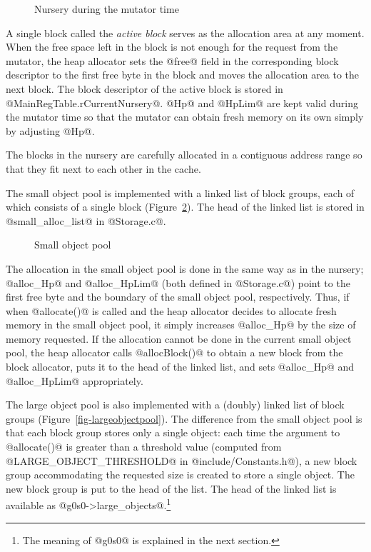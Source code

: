 \documentclass{article}
\begin{document}
\begin{figure}[ht]
\begin{center}

\caption{Nursery during the mutator time}
\label{fig-nursery}
\end{center}
\end{figure}

A single block called the \emph{active block} serves as the allocation area 
at any moment.
When the free space left in the block is not enough for the request from 
the mutator, the heap allocator sets the @free@ field in the corresponding
block descriptor to the first free byte in the block and moves the allocation
area to the next block. 
The block descriptor of the active block is stored in 
@MainRegTable.rCurrentNursery@.
@Hp@ and @HpLim@ are kept valid during the mutator time so that
the mutator can obtain fresh memory on its own simply by adjusting @Hp@. 

The blocks in the nursery are carefully allocated in a contiguous address
range so that they fit next to each other in the cache. 

The small object pool is implemented with a linked list of block groups, 
each of which consists of a single block (Figure~\ref{fig-smallobjectpool}).
The head of the linked list is stored in @small_alloc_list@ in @Storage.c@.

\begin{figure}[ht]
\begin{center}

\caption{Small object pool}
\label{fig-smallobjectpool}
\end{center}
\end{figure}

The allocation in the small object pool is done in the same way as in the
nursery; @alloc_Hp@ and @alloc_HpLim@ (both defined in @Storage.c@) 
point to the first free byte and the boundary of the small object pool, 
respectively.
Thus, if when @allocate()@ is called and the heap allocator decides to 
allocate fresh memory in the small object pool, it simply increases @alloc_Hp@
by the size of memory requested. 
If the allocation cannot be done in the current small object pool, the 
heap allocator calls @allocBlock()@ to obtain a new block from the block
allocator, puts it to the head of the linked list, and 
sets @alloc_Hp@ and @alloc_HpLim@ appropriately.

The large object pool is also implemented with a (doubly) linked list of block
groups (Figure~\ref{fig-largeobjectpool}). 
The difference from the small object pool is that each block group stores only 
a single object: each time the argument to @allocate()@ is
greater than a threshold value (computed from @LARGE_OBJECT_THRESHOLD@ 
in @include/Constants.h@), a new block group accommodating the requested size 
is created to store a single object. 
The new block group is put to the head of the list. 
The head of the linked list is available as @g0s0->large_objects@.\footnote{The 
meaning of @g0s0@ is explained in the next section.}
\end{document}
